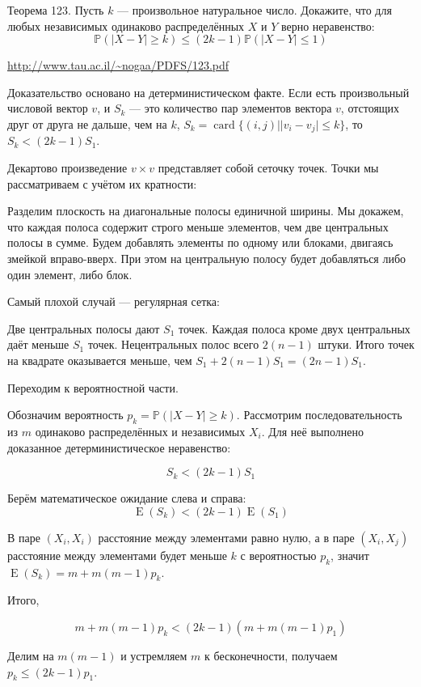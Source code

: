 \documentclass[nobib]{tufte-handout}
\theoremstyle{definition}
\newcounter{problem}
\newenvironment{problem}%
{%
\refstepcounter{problem}%
     \hypertarget{problem:{\theproblem}}{}
     \Writetofile{solution_file}{\protect\hypertarget{soln:\theproblem}{}}
     \begin{myenum}[label=\bfseries\protect\hyperlink{soln:\theproblem}{\theproblem},ref=\theproblem]
     \item%
    }%
    {%
    \end{myenum}}
\DeclareMathOperator{\card}{card}
\DeclareMathOperator{\E}{E}
\renewcommand{\P}{\mathbb{P}}
\begin{document}
\begin{problem}
Теорема 123. Пусть $k$ — произвольное натуральное число.
Докажите, что
для любых независимых одинаково распределённых $X$ и $Y$ верно неравенство:
\[
\P(|X-Y| \geq k) \leq (2k-1) \P(|X-Y| \leq 1)
\]


\begin{sol}
\url{http://www.tau.ac.il/~nogaa/PDFS/123.pdf}

Доказательство основано на детерминистическом факте.
Если есть произвольный числовой вектор $v$, и $S_k$
— это количество пар элементов вектора $v$,
отстоящих друг от друга не дальше, чем на $k$,
$S_k = \card \{ (i, j) | |v_i - v_j| \leq k\}$, то $S_k < (2k-1) S_1$.

Декартово произведение $v \times v$ представляет собой сеточку точек.
Точки мы рассматриваем с учётом их кратности:


Разделим плоскость на диагональные полосы единичной ширины.
Мы докажем, что каждая полоса содержит строго меньше элементов,
чем две центральных полосы в сумме. Будем добавлять элементы по одному или блоками,
двигаясь змейкой вправо-вверх.
При этом на центральную полосу будет добавляться либо один элемент, либо блок.



Самый плохой случай — регулярная сетка:


Две центральных полосы дают $S_1$ точек.
Каждая полоса кроме двух центральных даёт меньше $S_1$ точек.
Нецентральных полос всего $2(n-1)$ штуки.
Итого точек на квадрате оказывается меньше, чем $S_1 + 2(n-1)S_1 = (2n-1) S_1$.

Переходим к вероятностной части.

Обозначим вероятность $p_k = \P(|X-Y| \geq k)$.
Рассмотрим последовательность из $m$ одинаково распределённых и независимых $X_i$.
Для неё выполнено доказанное детерминистическое неравенство:

\[
S_k < (2k-1) S_1
\]

Берём математическое ожидание слева и справа:
\[
\E(S_k) < (2k - 1) \E(S_1)
\]

В паре $(X_i, X_i)$ расстояние между элементами равно нулю,
а в паре $(X_i, X_j)$ расстояние между элементами будет меньше $k$
с вероятностью $p_k$, значит $\E(S_k) = m + m(m-1) p_k$.

Итого,

\[
m + m(m-1) p_k < (2k-1) (m + m(m-1) p_1)
\]

Делим на $m(m-1)$ и устремляем $m$ к бесконечности, получаем $p_k \leq (2k - 1) p_1$.

\end{sol}

\end{problem}
\end{document}
